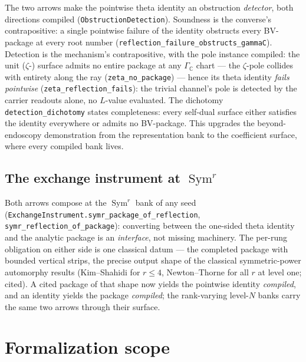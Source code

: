\documentclass[11pt]{article}
\theoremstyle{definition}
\newcommand{\Sym}{\operatorname{Sym}}
\begin{document}
The two arrows make the pointwise theta identity an obstruction \emph{detector},
both directions compiled (\texttt{ObstructionDetection}).  Soundness is the
converse's contrapositive: a single pointwise failure of the identity obstructs
every BV-package at every root number
(\texttt{reflection\_failure\_obstructs\_gammaC}).  Detection is the mechanism's
contrapositive, with the pole instance compiled: the unit ($\zeta$-) surface admits
no entire package at any $\Gamma_{\mathbb C}$ chart --- the $\zeta$-pole collides
with entirety along the ray (\texttt{zeta\_no\_package}) --- hence its theta
identity \emph{fails pointwise} (\texttt{zeta\_reflection\_fails}): the trivial
channel's pole is detected by the carrier readouts alone, no $L$-value evaluated.
The dichotomy \texttt{detection\_dichotomy} states completeness: every self-dual
surface either satisfies the identity everywhere or admits no BV-package.  This
upgrades the beyond-endoscopy demonstration from the representation bank to the
coefficient surface, where every compiled bank lives.

\subsection*{The exchange instrument at $\Sym^r$}

Both arrows compose at the $\Sym^r$ bank of any seed
(\texttt{ExchangeInstrument.symr\_package\_of\_reflection},
\texttt{symr\_reflection\_of\_package}): converting between the one-sided theta
identity and the analytic package is an \emph{interface}, not missing machinery.  The
per-rung obligation on either side is one classical datum --- the completed package
with bounded vertical strips, the precise output shape of the classical
symmetric-power automorphy results (Kim--Shahidi for $r\le4$, Newton--Thorne for all
$r$ at level one; cited).  A cited package of that shape now yields the pointwise
identity \emph{compiled}, and an identity yields the package \emph{compiled}; the
rank-varying level-$N$ banks carry the same two arrows through their surface.

\section{Formalization scope}
\end{document}

